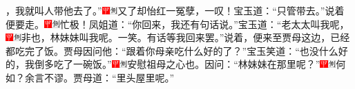 ，我就叫人带他去了。''{\includegraphics[width=3mm]{../Images/00002}\includegraphics[width=3mm]{../Images/00011}\footnotesize \kaishu 又了却怡红一冤孽，一叹！}宝玉道：``只管带去。''说着便要走。{\includegraphics[width=3mm]{../Images/00002}\includegraphics[width=3mm]{../Images/00011}\footnotesize \kaishu 忙极！}凤姐道：``你回来，我还有句话说。''宝玉道：``老太太叫我呢，{\includegraphics[width=3mm]{../Images/00002}\includegraphics[width=3mm]{../Images/00011}\footnotesize \kaishu 非也，林妹妹叫我呢。一笑。}有话等我回来罢。''说着，便来至贾母这边，已经都吃完了饭。贾母因问他：``跟着你母亲吃什么好的了？''宝玉笑道：``也没什么好的，我倒多吃了一碗饭。''{\includegraphics[width=3mm]{../Images/00002}\includegraphics[width=3mm]{../Images/00011}\footnotesize \kaishu 安慰祖母之心也。}因问：``林妹妹在那里呢？''{\includegraphics[width=3mm]{../Images/00002}\includegraphics[width=3mm]{../Images/00011}\footnotesize \kaishu 何如？余言不谬。}贾母道：``里头屋里呢。''

